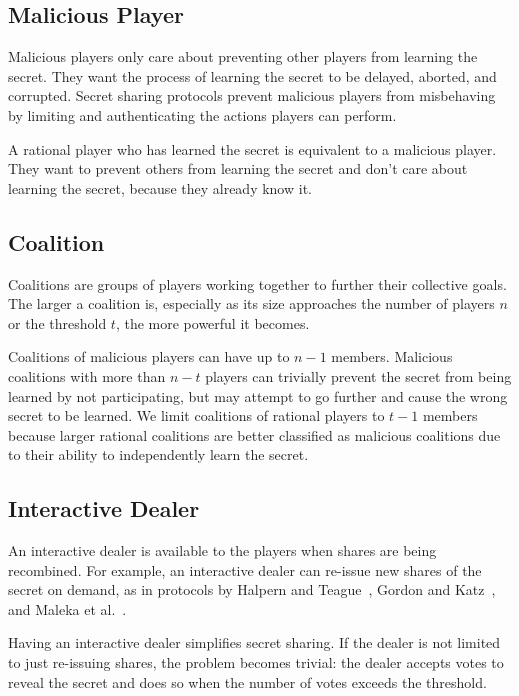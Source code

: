 \documentclass{dalcsthesis}
\begin{document}
\subsection{Malicious Player}

Malicious players only care about preventing other players from learning the secret. They want the process of learning the secret to be delayed, aborted, and corrupted. Secret sharing protocols prevent malicious players from misbehaving by limiting and authenticating the actions players can perform.

A rational player who has learned the secret is equivalent to a malicious player. They want to prevent others from learning the secret and don't care about learning the secret, because they already know it.

\subsection{Coalition}

Coalitions are groups of players working together to further their collective goals. The larger a coalition is, especially as its size approaches the number of players $n$ or the threshold $t$, the more powerful it becomes.

Coalitions of malicious players can have up to $n-1$ members. Malicious coalitions with more than $n-t$ players can trivially prevent the secret from being learned by not participating, but may attempt to go further and cause the wrong secret to be learned. We limit coalitions of rational players to $t-1$ members because larger rational coalitions are better classified as malicious coalitions due to their ability to independently learn the secret.

\subsection{Interactive Dealer}

An interactive dealer is available to the players when shares are being recombined. For example, an interactive dealer can re-issue new shares of the secret on demand, as in protocols by Halpern and Teague~\cite{halpern04}, Gordon and Katz~\cite{gordon06}, and Maleka et al.~\cite{maleka08}.

Having an interactive dealer simplifies secret sharing. If the dealer is not limited to just re-issuing shares, the problem becomes trivial: the dealer accepts votes to reveal the secret and does so when the number of votes exceeds the threshold.
\end{document}
